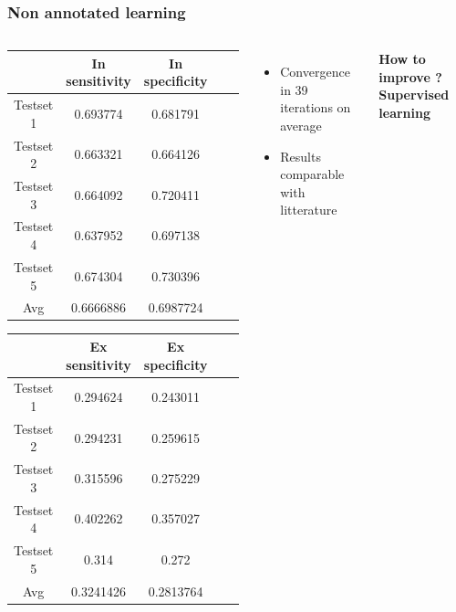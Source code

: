 \documentclass{beamer}
\begin{document}
\begin{frame}
\frametitle{Non annotated learning}
\begin{columns}

		\begin{scriptsize}
		\begin{table}[h!]
		
		\begin{tabular}{|c|c|c|c|c|}
		
			\hline
				&In sensitivity	& In specificity\\	
			\hline
				Testset 1	& 0.693774	& 0.681791\\
			\hline
				Testset 2	& 0.663321	& 0.664126\\
			\hline
				Testset 3	& 0.664092	& 0.720411\\
			\hline
				Testset 4	& 0.637952	& 0.697138\\
			\hline
				Testset 5	& 0.674304	& 0.730396\\
			\hline
				Avg		& 0.6666886	& 0.6987724\\
			\hline	
			
					
		\end{tabular}
		\vspace{0.5 cm}
		
		\begin{tabular}{|c|c|c|c|c|}
		
			\hline
				& Ex sensitivity	& Ex specificity\\
			\hline
				Testset 1& 0.294624	& 0.243011\\
			\hline
				Testset 2	& 0.294231	& 0.259615	\\
			\hline
				Testset 3	& 0.315596	& 0.275229\\
			\hline
				Testset 4	& 0.402262	& 0.357027\\
			\hline
				Testset 5	& 0.314		& 0.272\\
			\hline
				Avg		& 0.3241426	& 0.2813764\\
			\hline	
			
					
		\end{tabular}
		
		\end{table}
		

		\end{scriptsize}
		
		
		\begin{itemize}

			\item Convergence in 39 iterations on average

		
		\item Results comparable with litterature
		
		\end{itemize}
		\vspace{0.5 cm}
		 
		 \centering\textbf{How to improve ? Supervised learning}
\end{columns}


\end{frame}
\end{document}
